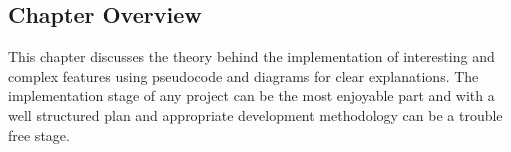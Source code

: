 \documentclass[12pt,a4paper]{article}
\begin{document}
	\subsection{Chapter Overview}
	This chapter discusses the theory behind the implementation of interesting and complex features using
pseudocode and diagrams for clear explanations. The implementation stage of any project can be the
most enjoyable part and with a well structured plan and appropriate development methodology can be
a trouble free stage.
	\begin{comment}
	\subsection{Implementing Extreme Programming (XP)}
	As discussed in section \ref{dev:agile}, this project used an agile methodology called Extreme Programming (XP).
This type of methodology utilises an iterative process involving customer communication and feedback.
The iterations were short with a new software version built at the end of each phase. Version control
helped with debugging as the versions could be rolled back to find the iteration that caused the bug.
\subsection{Data Storage and Retrieval}
	As discussed in Section \ref{Rel:RDBMS}, a RDBMS was the preferred storage method chosen for this project. The two
ER diagrams (Figure \ref{fig:entityone} and \ref{fig:entitytwo}) that were designed in Section \ref{sec:entity} helped with the implementation
of the database.\\

The structure of the database was just the first step of many with data retrieval being high in
priority. Recall from the background on requirement gathering (Section \ref{sec:gather}), most software systems
abide by Boehm’s cost model (Figure \ref{fig:req}) so a £1 cost of change in the requirement gathering can cost
up to £1000 in the deployment stage to fix. Therefore when implementing the code to retrieve data
from the database, we have to consider the case that in the future this system will need maintenance
and added features to keep the product competitive within the market. The problem is we cannot
predict the future; all we can do is rely on a well structured code base written using all the skills and
techniques from the field to ensure easy readability of the code.
\\To implement this requirement for database retrieval, the code used the object oriented advantages
of Java to create a database object that provided the database connection and data retrievals. Along
with this database object, inheritance played an important role as a generic class created the SQL
statements using an array of table field names and input values. Any object that required to send or retrieve data to the database could extend this generic class giving that object the functionality to
insert, delete and update any table within the database.


\end{comment}
\end{document}
